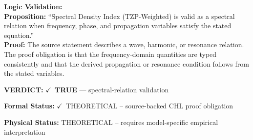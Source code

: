 \textbf{Logic Validation:}\\
\textbf{Proposition:} ``Spectral Density Index (TZP-Weighted) is valid as a spectral relation when frequency,
phase, and propagation variables satisfy the stated equation.''\\
\textbf{Proof:} The source statement describes a wave, harmonic, or resonance relation. The proof
obligation is that the frequency-domain quantities are typed consistently and that the
derived propagation or resonance condition follows from the stated variables.

\textbf{VERDICT:} \ensuremath{\checkmark}\ \textbf{TRUE} --- spectral-relation validation

\textbf{Formal Status:} \ensuremath{\checkmark}\ THEORETICAL -- source-backed CHL proof obligation

\textbf{Physical Status:} THEORETICAL -- requires model-specific empirical interpretation
\par\vspace{0.45em}
\par
\ifTZPDarkEdition
{}
\fi
\endgroup
\endgroup
